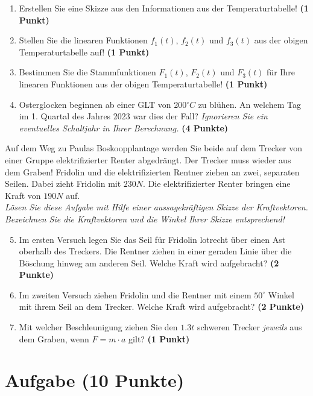 \documentclass[a4paper, 9pt]{scrartcl}\usepackage[]{graphicx}\usepackage[]{xcolor}
\begin{document}
\begin{enumerate}
\item Erstellen Sie eine Skizze aus den Informationen aus der Temperaturtabelle!  \textbf{(1 Punkt)}
\item Stellen Sie die linearen Funktionen $f_1(t)$, $f_2(t)$ und $f_3(t)$ aus der obigen Temperaturtabelle auf!  \textbf{(1 Punkt)}
\item Bestimmen Sie die Stammfunktionen $F_1(t)$, $F_2(t)$ und $F_3(t)$ für Ihre linearen Funktionen aus der obigen Temperaturtabelle!  \textbf{(1 Punkt)}
\item Osterglocken beginnen ab einer GLT von 200$^\circ C$ zu blühen. An welchem Tag im 1. Quartal des Jahres 2023 war dies der Fall? \textit{Ignorieren Sie ein eventuelles Schaltjahr in Ihrer Berechnung.} \textbf{(4 Punkte)}
\end{enumerate}

Auf dem Weg zu Paulas Boskoopplantage werden Sie beide auf dem Trecker von einer Gruppe elektrifizierter Renter abgedrängt. Der Trecker muss wieder aus dem Graben! Fridolin und die elektrifizierten Rentner ziehen an zwei, separaten Seilen. Dabei zieht Fridolin mit $230N$. Die elektrifizierter Renter  bringen eine Kraft von $190N$ auf.\\

\textit{Lösen Sie diese Aufgabe mit Hilfe einer aussagekräftigen Skizze der Kraftvektoren. Bezeichnen Sie die Kraftvektoren und die Winkel Ihrer Skizze entsprechend!}

\begin{enumerate}
  \setcounter{enumi}{4}  
\item Im ersten Versuch legen Sie das Seil für Fridolin lotrecht über einen Ast oberhalb des Treckers. Die Rentner ziehen in einer geraden Linie über die Böschung hinweg am anderen Seil. Welche Kraft wird aufgebracht?  \textbf{(2 Punkte)}
\item Im zweiten Versuch ziehen Fridolin und die Rentner mit einem $50^\circ$ Winkel mit ihrem Seil an dem Trecker. Welche Kraft wird aufgebracht? \textbf{(2 Punkte)}
\item Mit welcher Beschleunigung ziehen Sie den $1.3t$ schweren Trecker \textit{jeweils} aus dem Graben, wenn $F = m \cdot a$ gilt? \textbf{(1 Punkt)}
\end{enumerate}

 
\clearpage

\section{Aufgabe \hfill (10 Punkte)}
\end{document}
